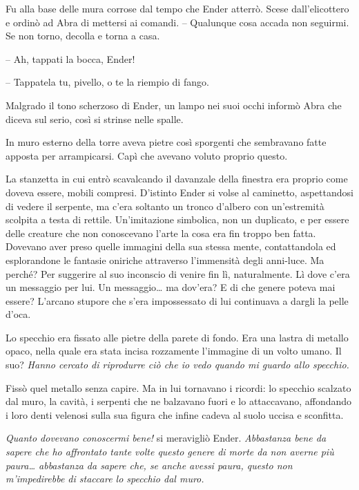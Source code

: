{Fu alla base delle mura corrose dal tempo che Ender atterrò. Scese
	dall'elicottero e ordinò ad Abra di mettersi ai comandi. -- Qualunque
	cosa accada non seguirmi. Se non torno, decolla e torna a casa.}

{-- Ah, tappati la bocca, Ender!}

{-- Tappatela tu, pivello, o te la riempio di fango.}

{Malgrado il tono scherzoso di Ender, un lampo nei suoi occhi informò
	Abra che diceva sul serio, così si strinse nelle spalle.}

{In muro esterno della torre aveva pietre così sporgenti che sembravano
	fatte apposta per arrampicarsi. Capì che avevano voluto proprio questo.}

{La stanzetta in cui entrò scavalcando il davanzale della finestra era
	proprio come doveva essere, mobili compresi. D'istinto Ender si volse al
	caminetto, aspettandosi di vedere il serpente, ma c'era soltanto un
	tronco d'albero con un'estremità scolpita a testa di rettile.
	Un'imitazione simbolica, non un duplicato, e per essere delle creature
	che non conoscevano l'arte la cosa era fin troppo ben fatta. Dovevano
	aver preso quelle immagini della sua stessa mente, contattandola ed
	esplorandone le fantasie oniriche attraverso l'immensità degli
	anni-luce. Ma perché? Per suggerire al suo inconscio di venire fin lì,
	naturalmente. Lì dove c'era un messaggio per lui. Un messaggio\ldots{}
	ma dov'era? E di che genere poteva mai essere? L'arcano stupore che
	s'era impossessato di lui continuava a dargli la pelle d'oca.}

{Lo specchio era fissato alle pietre della parete di fondo. Era una
	lastra di metallo opaco, nella quale era stata incisa rozzamente
	l'immagine di un volto umano. Il suo? \emph{Hanno cercato di riprodurre
		ciò che io vedo quando mi guardo allo specchio.}}

{Fissò quel metallo senza capire. Ma in lui tornavano i ricordi: lo
	specchio scalzato dal muro, la cavità, i serpenti che ne balzavano fuori
	e lo attaccavano, affondando i loro denti velenosi sulla sua figura che
	infine cadeva al suolo uccisa e sconfitta.}

\emph{{Quanto dovevano conoscermi bene! }}{si meravigliò Ender.
	\emph{Abbastanza bene da sapere che ho affrontato tante volte questo
		genere di morte da non averne più paura\ldots{} abbastanza da sapere
		che, se anche avessi paura, questo non m'impedirebbe di staccare lo
		specchio dal muro.}}

